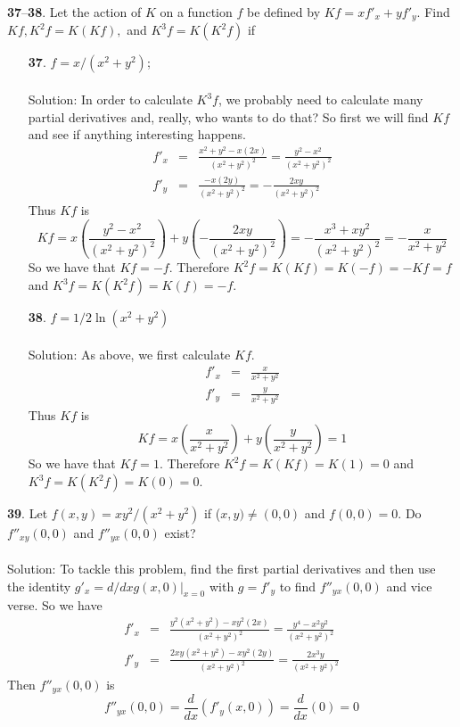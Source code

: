\documentclass[12pt]{amsbook}
\begin{document}
\noindent
{\small {\bf 37}--{\bf 38}}. Let the action of $K$ on a function $f$ be defined by $Kf = xf'_x+yf'_y$.
Find $Kf, K^2f=K(Kf), $ and $K^3f=K(K^2f)$ if
\begin{enumerate}
\item[{\small\bf 37}.] $f=x/(x^2+y^2)$;
\\
\\
{\sc Solution}: In order to calculate $K^3f$, we probably need to calculate many partial derivatives and, really, who wants to do that? So first we will find $Kf$ and see if anything interesting happens.
\begin{eqnarray*}
f'_x&=&\frac{x^2+y^2-x(2x)}{(x^2+y^2)^2}=\frac{y^2-x^2}{(x^2+y^2)^2} \\
f'_y&=&\frac{-x(2y)}{(x^2+y^2)^2}=-\frac{2xy}{(x^2+y^2)^2} 
\end{eqnarray*}
Thus $Kf$ is
$$Kf=x(\frac{y^2-x^2}{(x^2+y^2)^2})+y(-\frac{2xy}{(x^2+y^2)^2} )=-\frac{x^3+xy^2}{(x^2+y^2)^2}=-\frac{x}{x^2+y^2}$$
So we have that $Kf=-f$. Therefore $K^2f=K(Kf)=K(-f)=-Kf=f$ and $K^3f=K(K^2f)=K(f)=-f$.
\\
\item[{\small\bf 38}.] $f=1/2\ln(x^2+y^2)$
\\
\\
{\sc Solution}: As above, we first calculate $Kf$.
\begin{eqnarray*}
f'_x&=&\frac{x}{x^2+y^2} \\
f'_y&=&\frac{y}{x^2+y^2} 
\end{eqnarray*}
Thus $Kf$ is
$$Kf=x(\frac{x}{x^2+y^2})+y(\frac{y}{x^2+y^2})=1$$
So we have that $Kf=1$. Therefore $K^2f=K(Kf)=K(1)=0$ and $K^3f=K(K^2f)=K(0)=0$.
\\
\end{enumerate}
\noindent
{\small\bf 39}. Let $f(x,y)=xy^2/(x^2+y^2)$ if ($x, y) \neq (0, 0)$ and $f(0, 0) = 0$. Do $f''_{xy}(0,0)$ and $f''_{yx}(0,0)$ exist?
\\
\\
{\sc Solution}: To tackle this problem, find the first partial derivatives and then use the identity $g'_x=d/dx g(x,0)|_{x=0}$ with $g=f'_y$ to find $f''_{yx}(0,0)$ and vice verse. So we have
\begin{eqnarray*}
f'_x&=&\frac{y^2(x^2+y^2)-xy^2(2x)}{(x^2+y^2)^2}=\frac{y^4-x^2y^2}{(x^2+y^2)^2} \\
f'_y&=&\frac{2xy(x^2+y^2)-xy^2(2y)}{(x^2+y^2)^2}=\frac{2x^3y}{(x^2+y^2)^2} 
\end{eqnarray*}
Then $f''_{yx}(0,0)$ is
$$f''_{yx}(0,0)=\frac{d}{dx}(f'_{y}(x,0))=\frac{d}{dx}(0)=0$$
\end{document}
